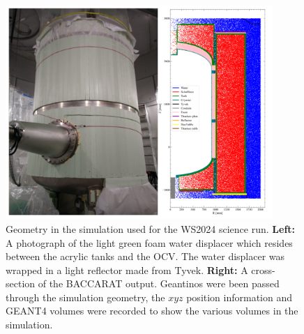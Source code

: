 \begin{figure}[ht!]
	\centering
	\includegraphics[width=0.9\textwidth]{figures/VetoEfficiency/FoamImgAndSimGeoTogether.png}
	\caption[An image of the foam displacer surrounding the OCS and final geometry in the simulation used for the WS2024 science run.]{Geometry in the simulation used for the WS2024 science run. \textbf{Left:} A photograph of the light green foam water displacer which resides between the acrylic tanks and the OCV. The water displacer was wrapped in a light reflector made from Tyvek. \textbf{Right:} A cross-section of the BACCARAT output. Geantinos were been passed through the simulation geometry, the $xyz$ position information and GEANT4 volumes were recorded to show the various volumes in the simulation.}
	\label{fig:VetoEff/od_geometry_for_sr3}
\end{figure}

